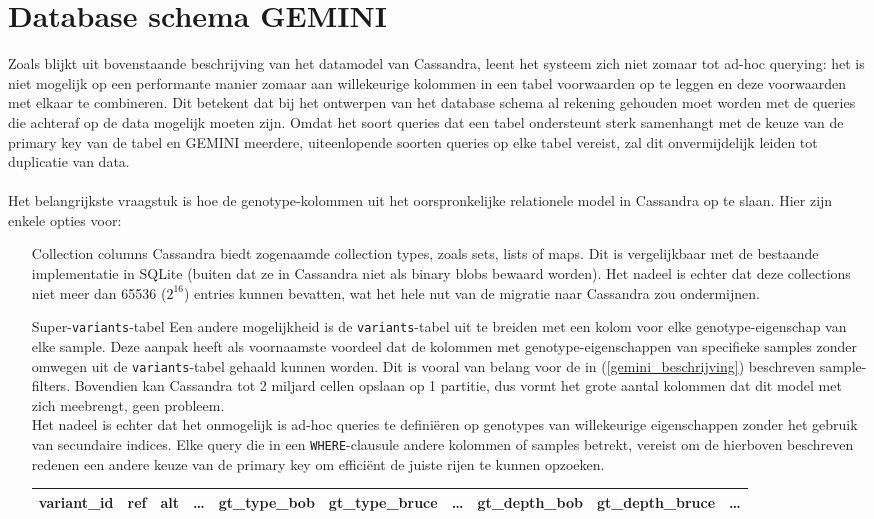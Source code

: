 \section{Database schema GEMINI}
Zoals blijkt uit bovenstaande beschrijving van het datamodel van Cassandra, leent het systeem zich niet zomaar tot ad-hoc querying: het is niet mogelijk op een performante manier zomaar aan willekeurige kolommen in een tabel voorwaarden op te leggen en deze voorwaarden met elkaar te combineren. Dit betekent dat bij het ontwerpen van het database schema al rekening gehouden moet worden met de queries die achteraf op de data mogelijk moeten zijn. Omdat het soort queries dat een tabel ondersteunt sterk samenhangt met de keuze van de primary key van de tabel en GEMINI meerdere, uiteenlopende soorten queries op elke tabel vereist, zal dit onvermijdelijk leiden tot duplicatie van data.\\\\

Het belangrijkste vraagstuk is hoe de genotype-kolommen uit het oorspronkelijke relationele model in Cassandra op te slaan. Hier zijn enkele opties voor:

\begin{itemize}

\item[Collection columns] Cassandra biedt zogenaamde collection types, zoals sets, lists of maps. Dit is vergelijkbaar met de bestaande implementatie in SQLite (buiten dat ze in Cassandra niet als binary blobs bewaard worden). Het nadeel is echter dat deze collections niet meer dan 65536 ($2^{16}$) entries kunnen bevatten, wat het hele nut van de migratie naar Cassandra zou ondermijnen.

\item[Super-\texttt{variants}-tabel] Een andere mogelijkheid is de \texttt{variants}-tabel uit te breiden met een kolom voor elke genotype-eigenschap van elke sample. Deze aanpak heeft als voornaamste voordeel dat de kolommen met genotype-eigenschappen van specifieke samples zonder omwegen uit de \texttt{variants}-tabel gehaald kunnen worden. Dit is vooral van belang voor de in (\ref{gemini_beschrijving}) beschreven sample-filters. Bovendien kan Cassandra tot 2 miljard cellen opslaan op 1 partitie, dus vormt het grote aantal kolommen dat dit model met zich meebrengt, geen probleem.\\
Het nadeel is echter dat het onmogelijk is ad-hoc queries te defini\"eren op genotypes van willekeurige eigenschappen zonder het gebruik van secundaire indices. Elke query die in een \texttt{WHERE}-clausule andere kolommen of samples betrekt, vereist om de hierboven beschreven redenen een andere keuze van de primary key om effici\"ent de juiste rijen te kunnen opzoeken.

\begin{table}[!htbp]
\begin{tabular}{@{}|l|l|l|l|l|l|l|l|l|l|@{}}
\toprule
variant\_id & ref & alt & \ldots & gt\_type\_bob & gt\_type\_bruce & \ldots & gt\_depth\_bob & gt\_depth\_bruce & \ldots \\ \bottomrule
\end{tabular}
\end{table}


\end{itemize}
 